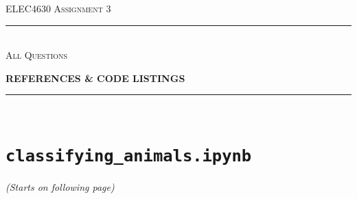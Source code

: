 \begin{titlepage}
  \centering

  \textsc{ELEC4630 Assignment 3}\\
  \vspace{9cm}

  \rule{\linewidth}{0.5pt}\\

  \vspace{1em}
  \LARGE\textsc{All Questions}\\
  \vspace{1em}

  \LARGE\uppercase{\textbf{{References \& Code Listings}}}\\

  \rule{\linewidth}{2pt}\\

  \vfill

\end{titlepage}

\printbibliography

\newpage
\appendix

\section{\texttt{classifying\_animals.ipynb}} \label{app:classifying_animals_ipynb}
\textit{(Starts on following page)}

